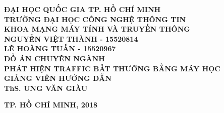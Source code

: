 \documentclass[main-report.tex]{subfiles}
\begin{document}
\begin{titlepage}
\thispagestyle{empty}
\thisfancypage{
\setlength{\fboxsep}{3pt}
\fbox}{} 
\begin{center}
{\bf\large ĐẠI HỌC QUỐC GIA TP. HỒ CHÍ MINH}\\
{\bf\subtitlesize TRƯỜNG ĐẠI HỌC CÔNG NGHỆ THÔNG TIN}\\
{\bf\subtitlesize KHOA MẠNG MÁY TÍNH VÀ TRUYỀN THÔNG}\\[4cm]

{\bf\large NGUYỄN VIỆT THÀNH - 15520814}\\
{\bf\large LÊ HOÀNG TUẤN - 15520967}\\[4cm]

{\bf\subtitlesize ĐỒ ÁN CHUYÊN NGÀNH}\\[0.2cm]
{\bf\titlesize PHÁT HIỆN TRAFFIC BẤT THƯỜNG BẰNG MÁY HỌC}\\[6cm]

{\bf GIẢNG VIÊN HƯỚNG DẪN}\\
{\bf ThS. UNG VĂN GIÀU}
\end{center}

\vspace{3cm}
\begin{center}
{\bf TP. HỒ CHÍ MINH, 2018}
\end{center}
\end{titlepage}
\end{document}
